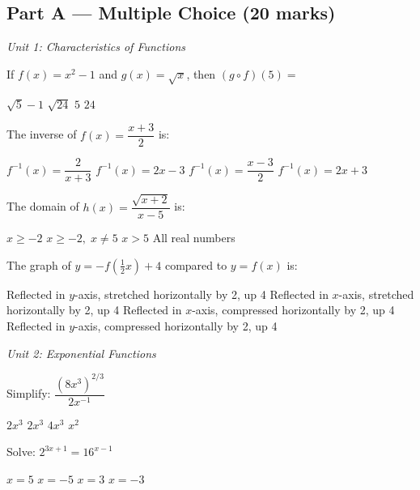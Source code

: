 \documentclass[addpoints]{exam}
\begin{document}
\newpage
\begin{questions}

\section*{Part A --- Multiple Choice (20 marks)}
\vspace{3mm}
\noindent\textit{Unit 1: Characteristics of Functions}
\vspace{3mm}

\question[1] If $f(x) = x^2 - 1$ and $g(x) = \sqrt{x}$, then $(g \circ f)(5) =$
\begin{choices}
    \choice $\sqrt{5} - 1$
    \correctchoice $\sqrt{24}$
    \choice $5$
    \choice $24$
\end{choices}

\question[1] The inverse of $f(x) = \dfrac{x+3}{2}$ is:
\begin{choices}
    \choice $f^{-1}(x) = \dfrac{2}{x+3}$
    \correctchoice $f^{-1}(x) = 2x - 3$
    \choice $f^{-1}(x) = \dfrac{x-3}{2}$
    \choice $f^{-1}(x) = 2x + 3$
\end{choices}

\question[1] The domain of $h(x) = \dfrac{\sqrt{x+2}}{x - 5}$ is:
\begin{choices}
    \choice $x \geq -2$
    \correctchoice $x \geq -2,\; x \neq 5$
    \choice $x > 5$
    \choice All real numbers
\end{choices}

\question[1] The graph of $y = -f\!\left(\tfrac{1}{2}x\right) + 4$ compared to
$y = f(x)$ is:
\begin{choices}
    \choice Reflected in $y$-axis, stretched horizontally by 2, up 4
    \correctchoice Reflected in $x$-axis, stretched horizontally by 2, up 4
    \choice Reflected in $x$-axis, compressed horizontally by 2, up 4
    \choice Reflected in $y$-axis, compressed horizontally by 2, up 4
\end{choices}

\vspace{3mm}
\noindent\textit{Unit 2: Exponential Functions}
\vspace{3mm}

\question[1] Simplify: $\dfrac{(8x^3)^{2/3}}{2x^{-1}}$
\begin{choices}
    \choice $2x^3$
    \correctchoice $2x^3$
    \choice $4x^3$
    \choice $x^2$
\end{choices}

\question[1] Solve: $2^{3x+1} = 16^{x-1}$
\begin{choices}
    \choice $x = 5$
    \correctchoice $x = -5$
    \choice $x = 3$
    \choice $x = -3$
\end{choices}


\end{questions}
\end{document}
